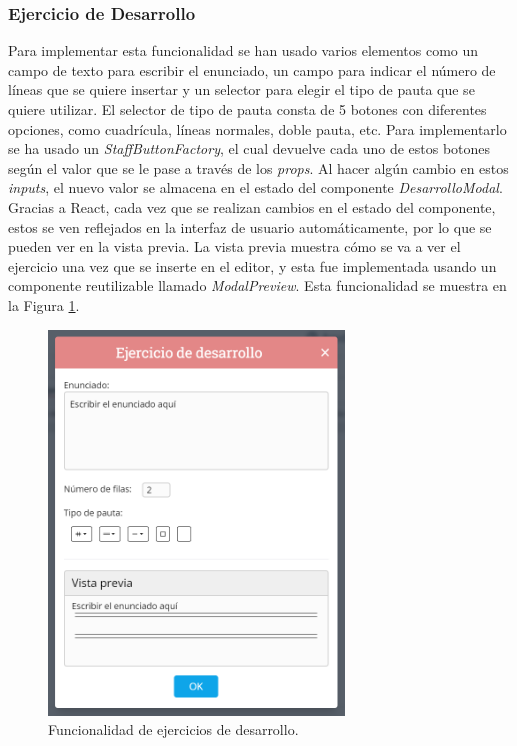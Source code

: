 \subsubsection{Ejercicio de Desarrollo}
Para implementar esta funcionalidad se han usado varios elementos como un campo de texto para escribir el enunciado, un campo para indicar el número de líneas que se quiere insertar y un selector para elegir el tipo de pauta que se quiere utilizar. El selector de tipo de pauta consta de 5 botones con diferentes opciones, como cuadrícula, líneas normales, doble pauta, etc. Para implementarlo se ha usado un \textit{StaffButtonFactory}, el cual devuelve cada uno de estos botones según el valor que se le pase a través de los \textit{props}. Al hacer algún cambio en estos \textit{inputs}, el nuevo valor se almacena en el estado del componente \textit{DesarrolloModal}. Gracias a React, cada vez que se realizan cambios en el estado del componente, estos se ven reflejados en la interfaz de usuario automáticamente, por lo que se pueden ver en la vista previa. La vista previa muestra cómo se va a ver el ejercicio una vez que se inserte en el editor, y esta fue implementada usando un componente reutilizable llamado \textit{ModalPreview}. Esta funcionalidad se muestra en la Figura \ref{fig:funcionalidadDesarrollo}.

\begin{figure}[ht!]
  \centering
  \includegraphics[width=0.7\textwidth]{Imagenes/Implementacion/DesarrolloModal.PNG}
  \caption{Funcionalidad de ejercicios de desarrollo.}
  \label{fig:funcionalidadDesarrollo}
\end{figure}


